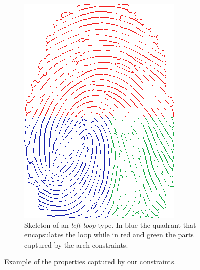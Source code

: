 \documentclass[8pt]{article}
\begin{document}
\begin{figure}
\begin{subfigure}{.48\textwidth}
	\includegraphics[width=0.86\linewidth]{img/loop}
	\caption{Skeleton of an \textit{left-loop} type. In blue the quadrant that encapsulates the loop while in red and green the parts captured by the arch constraints.}
	\label{fig:loop}
\end{subfigure}%
\caption{Example of the properties captured by our constraints.}
\label{fig:example}
\end{figure}
\end{document}
